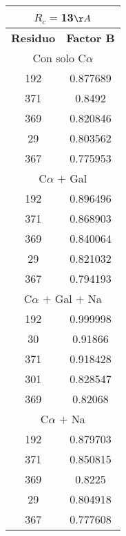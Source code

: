 \begin{tabular}[c]{|c|c|}
\multicolumn{2}{c}{$R_c=$13$\AA$}\\\hline
\textbf{Residuo}&\textbf{Factor B}\\\hline
\multicolumn{2}{c}{Con solo C$\alpha$}\\\hline
       192&  0.877689\\
       371&    0.8492\\
       369&  0.820846\\
        29&  0.803562\\
       367&  0.775953\\
\hline
\multicolumn{2}{c}{C$\alpha$ $+$ Gal}\\\hline
       192&  0.896496\\
       371&  0.868903\\
       369&  0.840064\\
        29&  0.821032\\
       367&  0.794193\\
\hline
\multicolumn{2}{c}{C$\alpha$ $+$ Gal $+$ Na}\\\hline
       192&  0.999998\\
        30&   0.91866\\
       371&  0.918428\\
       301&  0.828547\\
       369&   0.82068\\
\hline
\multicolumn{2}{c}{C$\alpha$ $+$ Na}\\\hline
       192&  0.879703\\
       371&  0.850815\\
       369&    0.8225\\
        29&  0.804918\\
       367&  0.777608\\
\hline
\end{tabular}
